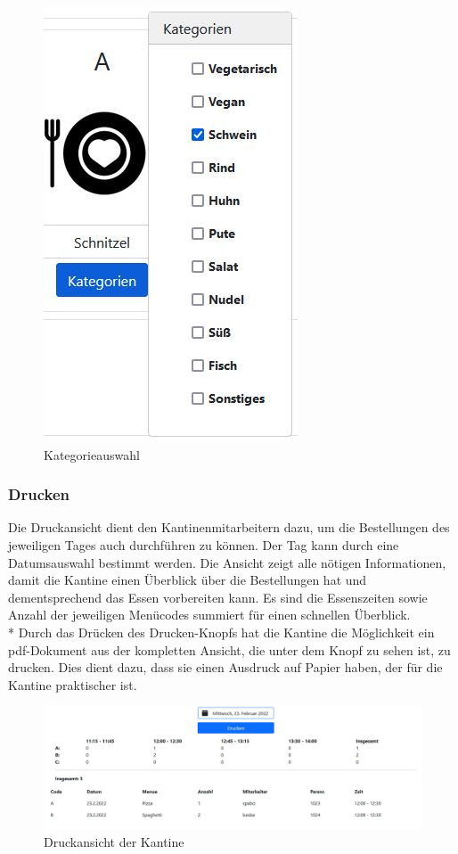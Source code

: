 \begin{figure}[htp]
    \centering
    \includegraphics[scale=0.4]{pics/kategorien_kantine.JPG}
    \caption{Kategorieauswahl}
    \label{fig:impl:CategoryChooseCantine}
\end{figure}
\pagebreak

\subsubsection {Drucken}

Die Druckansicht dient den Kantinenmitarbeitern dazu, um die Bestellungen des jeweiligen Tages auch durchführen zu können.
Der Tag kann durch eine Datumsauswahl bestimmt werden.
Die Ansicht zeigt alle nötigen Informationen, damit die Kantine einen Überblick über die Bestellungen hat und dementsprechend das Essen vorbereiten kann.
Es sind die Essenszeiten sowie Anzahl der jeweiligen Menücodes summiert für einen schnellen Überblick. \\*
Durch das Drücken des Drucken-Knopfs hat die Kantine die Möglichkeit ein pdf-Dokument aus der kompletten Ansicht, die unter dem Knopf zu sehen ist, zu drucken.
Dies dient dazu, dass sie einen Ausdruck auf Papier haben, der für die Kantine praktischer ist.

\begin{figure}[htp]
    \centering
    \includegraphics[scale=0.45]{pics/kantine_drucken.JPG}
    \caption{Druckansicht der Kantine}
    \label{fig:impl:CantinePrint}
\end{figure}

